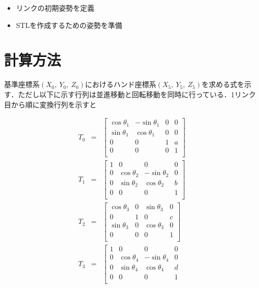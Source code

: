 \documentclass[a4paper,10pt]{jsarticle}
\begin{document}
\begin{itemize}
 \item リンクの初期姿勢を定義
 \item STLを作成するための姿勢を準備
\end{itemize}

\section{計算方法}
基準座標系$(X_0,\ Y_0,\ Z_0)$におけるハンド座標系$(X_5,\ Y_5,\ Z_5)$を求める式を示す．ただし以下に示す行列は並進移動と回転移動を同時に行っている．1リンク目から順に変換行列を示すと

\begin{eqnarray}
\label{eq:a}
  T_0 &=&
  \left[
    \begin{array}{cccc}
      \cos{\theta_1} & -\sin{\theta_1} & 0 & 0 \\
      \sin{\theta_1} & \cos{\theta_1} & 0 & 0\\
      0 & 0 & 1 & a\\
      0 & 0 & 0 & 1\\
    \end{array}
  \right]\\
  T_1 &=&
  \left[
    \begin{array}{cccc}
      1 & 0 & 0 & 0 \\
      0 & \cos{\theta_2} & -\sin{\theta_2} & 0\\
      0 & \sin{\theta_2} & \cos{\theta_2} & b\\
      0 & 0 & 0 & 1\\
    \end{array}
  \right]\\
  T_2 &=&
  \left[
    \begin{array}{cccc}
      \cos{\theta_3} & 0 & \sin{\theta_3} & 0 \\
      0 & 1 & 0 & c\\
      \sin{\theta_3} & 0 & \cos{\theta_3} & 0\\
      0 & 0 & 0 & 1\\
    \end{array}
  \right]\\
  T_3 &=&
  \left[
    \begin{array}{cccc}
      1 & 0 & 0 & 0 \\
      0 & \cos{\theta_4} & -\sin{\theta_4} & 0\\
      0 & \sin{\theta_4} & \cos{\theta_4} & d\\
      0 & 0 & 0 & 1\\

\end{array}
\end{eqnarray}
\end{document}
